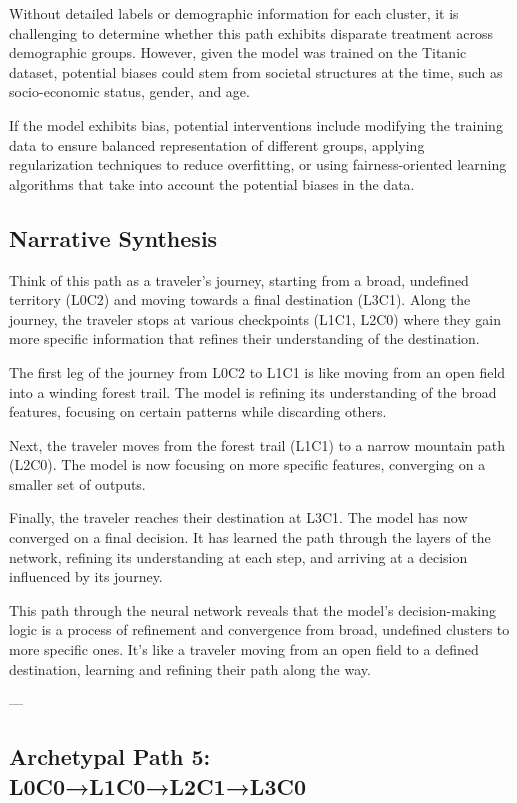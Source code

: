 Without detailed labels or demographic information for each cluster, it is challenging to determine whether this path exhibits disparate treatment across demographic groups. However, given the model was trained on the Titanic dataset, potential biases could stem from societal structures at the time, such as socio-economic status, gender, and age. 

If the model exhibits bias, potential interventions include modifying the training data to ensure balanced representation of different groups, applying regularization techniques to reduce overfitting, or using fairness-oriented learning algorithms that take into account the potential biases in the data.

\subsection*{Narrative Synthesis}

Think of this path as a traveler’s journey, starting from a broad, undefined territory (L0C2) and moving towards a final destination (L3C1). Along the journey, the traveler stops at various checkpoints (L1C1, L2C0) where they gain more specific information that refines their understanding of the destination.

The first leg of the journey from L0C2 to L1C1 is like moving from an open field into a winding forest trail. The model is refining its understanding of the broad features, focusing on certain patterns while discarding others.

Next, the traveler moves from the forest trail (L1C1) to a narrow mountain path (L2C0). The model is now focusing on more specific features, converging on a smaller set of outputs.

Finally, the traveler reaches their destination at L3C1. The model has now converged on a final decision. It has learned the path through the layers of the network, refining its understanding at each step, and arriving at a decision influenced by its journey.

This path through the neural network reveals that the model's decision-making logic is a process of refinement and convergence from broad, undefined clusters to more specific ones. It’s like a traveler moving from an open field to a defined destination, learning and refining their path along the way.

---

\subsection*{Archetypal Path 5: L0C0→L1C0→L2C1→L3C0}

